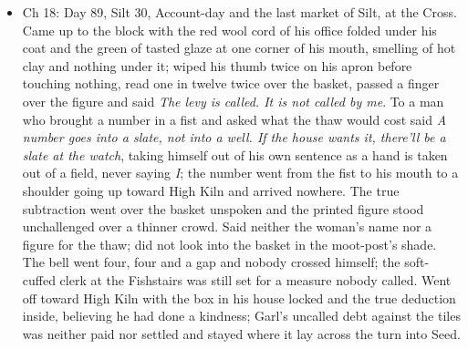 \documentclass{design/chronicle}
\begin{document}
{\begin{itemize}[leftmargin=1.4em,itemsep=1pt,topsep=3pt,parsep=0pt]
\end{itemize}

\begin{itemize}[leftmargin=1.4em,itemsep=1pt,topsep=3pt,parsep=0pt]

\item Ch 18: Day 89, Silt 30, Account-day and the last market of Silt, at the Cross. Came up to the block with the red wool cord of his office folded under his coat and the green of tasted glaze at one corner of his mouth, smelling of hot clay and nothing under it; wiped his thumb twice on his apron before touching nothing, read one in twelve twice over the basket, passed a finger over the figure and said \emph{The levy is called. It is not called by me}. To a man who brought a number in a fist and asked what the thaw would cost said \emph{A number goes into a slate, not into a well. If the house wants it, there’ll be a slate at the watch}, taking himself out of his own sentence as a hand is taken out of a field, never saying \emph{I}; the number went from the fist to his mouth to a shoulder going up toward High Kiln and arrived nowhere. The true subtraction went over the basket unspoken and the printed figure stood unchallenged over a thinner crowd. Said neither the woman’s name nor a figure for the thaw; did not look into the basket in the moot-post’s shade. The bell went four, four and a gap and nobody crossed himself; the soft-cuffed clerk at the Fishstairs was still set for a measure nobody called. Went off toward High Kiln with the box in his house locked and the true deduction inside, believing he had done a kindness; Garl’s uncalled debt against the tiles was neither paid nor settled and stayed where it lay across the turn into Seed.

\end{itemize}

\begin{itemize}[leftmargin=1.4em,itemsep=1pt,topsep=3pt,parsep=0pt]


\end{itemize}}
\end{document}
